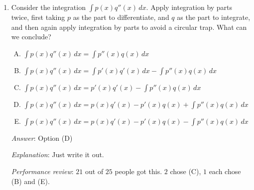 \documentclass[10pt]{amsart}
\begin{document}
\begin{enumerate}
  \begin{enumerate}[(A)]
  \item $P = Q$
  \item $P = -Q$
  \item $PQ = 0$
  \item $P = 1 - Q$
  \item $PQ = 1$
  \end{enumerate}

  {\em Answer}: Option (B)

  {\em Explanation}: Integration by parts gives us that:

  $$\int_a^b F(x)G'(x) \, dx = [F(x)G(x)]_a^b - \int_a^b F'(x)G(x) \, dx$$

  Since $G(x) = 0$ outside $(a,b)$, we get that $G(a) = G(b) = 0$, so
  that the evaluation of $[F(x)G(x)]_a^b$ gives $0$. We are thus left with:

  $$P = -Q$$

  {\em Performance review}: $19$ out of $25$ people got this. $3$
  chose (D), $2$ chose (A), $1$ chose (C).

  {\em Historical note (Math 153)}: $32$ out of $41$ got this. $5$ chose (A),
  $2$ chose (C), $1$ chose (D), $1$ wrote multiple options.

\item Consider the integration $\int p(x) q''(x) \,
  dx$. Apply integration by parts twice, first taking
  $p$ as the part to differentiate, and $q$ as
  the part to integrate, and then again apply integration by parts to
  avoid a circular trap. What can we conclude?

  \begin{enumerate}[(A)]
  \item $\int p(x) q''(x) \, dx = \int p''(x) q(x) \, dx$
  \item $\int p(x) q''(x) \, dx = \int p'(x) q'(x) \, dx - \int p''(x) q(x) \, dx$
  \item $\int p(x)q''(x) \,dx = p'(x)q'(x) - \int p''(x) q(x)\, dx$
  \item $\int p(x)q''(x) \,dx = p(x)q'(x) - p'(x)q(x) + \int p''(x) q(x)\, dx$
  \item $\int p(x)q''(x) \,dx = p(x)q'(x) - p'(x)q(x) - \int p''(x) q(x)\, dx$
  \end{enumerate}

  {\em Answer}: Option (D)

  {\em Explanation}: Just write it out.

  {\em Performance review}: $21$ out of $25$ people got this. $2$
  chose (C), $1$ each chose (B) and (E).


\end{enumerate}
\end{document}
